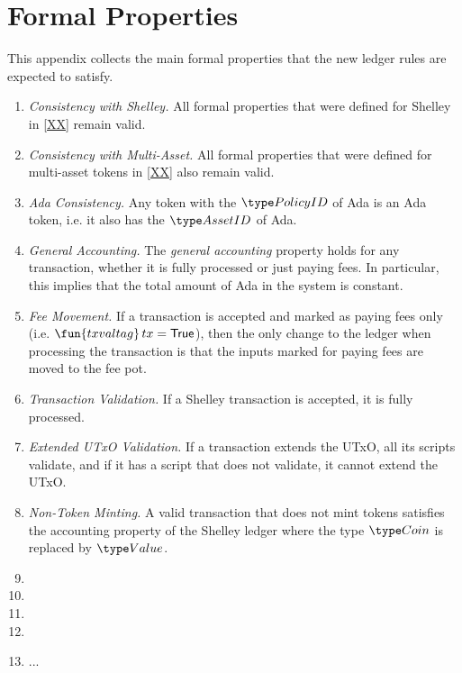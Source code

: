 \section{Formal Properties}
\label{sec:properties}

This appendix collects the main formal properties that the new ledger rules are expected to satisfy.

\begin{enumerate}[label=P{\arabic*}:\ ]
\item
  \emph{Consistency with Shelley.}
  All formal properties that were defined for Shelley in \ref{XX} remain valid.
\item
  \emph{Consistency with Multi-Asset.}
  All formal properties that were defined for multi-asset tokens in \ref{XX} also remain valid.
\item
  \emph{Ada Consistency.}
  Any token with the $\PolicyID$ of Ada is an Ada token, i.e. it
  also has the $\AssetID$ of Ada.
\item
  \emph{General Accounting.}
  The \emph{general accounting} property holds for any transaction,
  whether it is fully processed or just paying fees. In particular,
  this implies that the total amount of Ada in the system is constant.
\item
  \emph{Fee Movement.}
  If a transaction is accepted and marked as paying fees only
  (i.e. $\fun{txvaltag}\, tx = \True$), then the only change to the ledger
  when processing the transaction is that the inputs marked for paying
  fees are moved to the fee pot.
\item
  \emph{Transaction Validation.}
  If a Shelley transaction is accepted, it is fully processed.
\item
  \emph{Extended UTxO Validation.}
  If a transaction extends the UTxO, all its scripts validate, and
  if it has a script that does not validate, it cannot extend the
  UTxO.
\item
  \emph{Non-Token Minting.}
  A valid transaction that does not mint tokens satisfies the
  accounting property of the Shelley ledger where the type $\Coin$ is
  replaced by $\Value$.
\item
\item
\item
\item
\item
  ... 
\end{enumerate}
